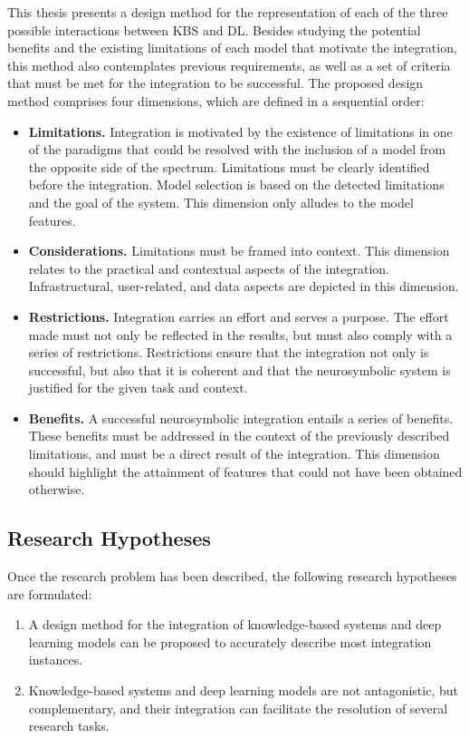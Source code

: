 This thesis presents a design method for the representation of each of the three possible interactions between KBS and DL. Besides studying the potential benefits and the existing limitations of each model that motivate the integration, this method also contemplates previous requirements, as well as a set of criteria that must be met for the integration to be successful. The proposed design method comprises four dimensions, which are defined in a sequential order:
\begin{itemize}
    \item \textbf{Limitations.} Integration is motivated by the existence of limitations in one of the paradigms that could be resolved with the inclusion of a model from the opposite side of the spectrum. Limitations must be clearly identified before the integration. Model selection is based on the detected limitations and the goal of the system. This dimension only alludes to the model features.
    
    \item \textbf{Considerations.} Limitations must be framed into context. This dimension relates to the practical and contextual aspects of the integration. Infrastructural, user-related, and data aspects are depicted in this dimension.
    
    \item \textbf{Restrictions.} Integration carries an effort and serves a purpose. The effort made must not only be reflected in the results, but must also comply with a series of restrictions. Restrictions ensure that the integration not only is successful, but also that it is coherent and that the neurosymbolic system is justified for the given task and context.
    
    \item \textbf{Benefits.} A successful neurosymbolic integration entails a series of benefits. These benefits must be addressed in the context of the previously described limitations, and must be a direct result of the integration. This dimension should highlight the attainment of features that could not have been obtained otherwise.
\end{itemize}

\subsection{Research Hypotheses}
Once the research problem has been described, the following research hypotheses are formulated:
\begin{enumerate} [start=1,label={\bfseries H\arabic*:}]
    \item A design method for the integration of knowledge-based systems and deep learning models can be proposed to accurately describe most integration instances. 
    \item Knowledge-based systems and deep learning models are not antagonistic, but complementary, and their integration can facilitate the resolution of several research tasks.
\end{enumerate}

